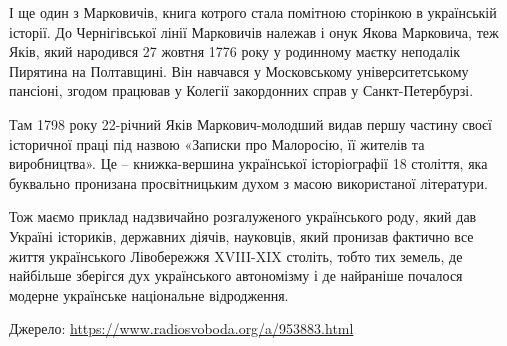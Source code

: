І ще один з Марковичів, книга котрого стала помітною сторінкою в українській
історії. До Чернігівської лінії Марковичів належав і онук Якова Марковича, теж
Яків, який народився 27 жовтня 1776 року у родинному маєтку неподалік Пирятина
на Полтавщині. Він навчався у Московському університетському пансіоні, згодом
працював у Колегії закордонних справ у Санкт-Петербурзі.

Там 1798 року 22-річний Яків Маркович-молодший видав першу частину своєї
історичної праці під назвою «Записки про Малоросію, її жителів та виробництва».
Це – книжка-вершина української історіографії 18 століття, яка буквально
пронизана просвітницьким духом з масою використаної літератури.

Тож маємо приклад надзвичайно розгалуженого українського роду, який дав Україні
істориків, державних діячів, науковців, який пронизав фактично все життя
українського Лівобережжя XVIII-XIX століть, тобто тих земель, де найбільше
зберігся дух українського автономізму і де найраніше почалося модерне
українське національне відродження.

Джерело:
\url{https://www.radiosvoboda.org/a/953883.html}

